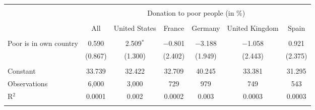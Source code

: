 
\begin{tabular}{@{\extracolsep{5pt}}lcccccc} 
\\[-1.8ex]\hline 
\hline \\[-1.8ex] 
 & \multicolumn{6}{c}{Donation to poor people (in \%)} \\ 
\cline{2-7} 
\\[-1.8ex] & All & United States & France & Germany & United Kingdom & Spain \\ 
\hline \\[-1.8ex] 
 Poor is in own country & 0.590 & 2.509$^{*}$ & $-$0.801 & $-$3.188 & $-$1.058 & 0.921 \\ 
  & (0.867) & (1.300) & (2.402) & (1.949) & (2.443) & (2.375) \\ 
 \hline \\[-1.8ex] 
Constant & 33.739 & 32.422 & 32.709 & 40.245 & 33.381 & 31.295 \\ 
Observations & 6,000 & 3,000 & 729 & 979 & 749 & 543 \\ 
R$^{2}$ & 0.0001 & 0.002 & 0.0002 & 0.003 & 0.0003 & 0.0003 \\ 
\hline 
\hline \\[-1.8ex] 
\end{tabular} 
